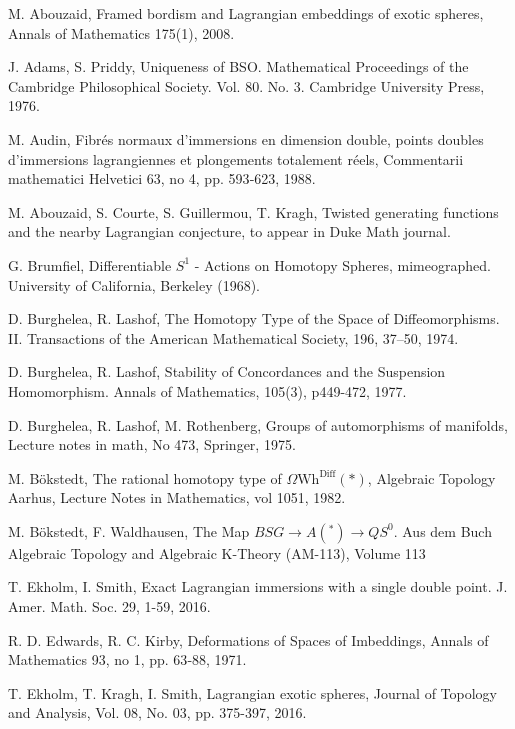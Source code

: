 \documentclass[reqno]{amsart}
\theoremstyle{theorem}
\theoremstyle{remark}
\theoremstyle{definition}
\begin{document}

%


\begin{thebibliography}{}


 M. Abouzaid, Framed bordism and Lagrangian embeddings of exotic spheres, Annals of Mathematics 175(1), 2008.

  J. Adams, S. Priddy, Uniqueness of BSO.  Mathematical Proceedings of the Cambridge Philosophical Society. Vol. 80. No. 3. Cambridge University Press, 1976.


 M. Audin, Fibr\'es normaux d’immersions en dimension double, points doubles d’immersions lagrangiennes et plongements totalement r\'eels, Commentarii mathematici Helvetici 63, no 4, pp. 593‑623, 1988.


 M. Abouzaid, S. Courte, S. Guillermou, T. Kragh, Twisted generating functions and the nearby Lagrangian conjecture, to appear in Duke Math journal.

 G. Brumfiel, Differentiable $S^1$ - Actions on Homotopy Spheres, mimeographed. University of California, Berkeley (1968).


 D. Burghelea, R. Lashof,  The Homotopy Type of the Space of Diffeomorphisms. II. Transactions of the American Mathematical Society, 196, 37–50, 1974.


 D. Burghelea, R. Lashof, Stability of Concordances and the Suspension Homomorphism. Annals of Mathematics, 105(3), p449-472, 1977.


 D. Burghelea, R. Lashof, M. Rothenberg, Groups of automorphisms of manifolds, Lecture notes in math, No 473, Springer, 1975.


 M. B\"okstedt, The rational homotopy type of $\Omega\text{Wh}^{\text{Diff}}(\ast)$, Algebraic Topology Aarhus, Lecture Notes in Mathematics, vol 1051, 1982.


 M. B\"okstedt, F. Waldhausen, The Map $ BSG \to A(^\ast) \to QS^0$. 
Aus dem Buch Algebraic Topology and Algebraic K-Theory (AM-113), Volume 113


 T. Ekholm, I. Smith, Exact Lagrangian immersions with a single double point. J. Amer. Math. Soc. 29, 1-59, 2016.


 R. D. Edwards, R. C. Kirby, Deformations of Spaces of Imbeddings, Annals of Mathematics 93, no 1, pp. 63‑88, 1971.


 T. Ekholm, T. Kragh, I. Smith, Lagrangian exotic spheres, Journal of Topology and Analysis, Vol. 08, No. 03, pp. 375-397, 2016.


\end{thebibliography}
\end{document}
